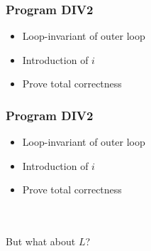 \begin{frame}[containsverbatim]
  \frametitle{Program DIV2}
  \begin{itemize}
    \item Loop-invariant of outer loop
    \item Introduction of $i$
    \item Prove total correctness
  \end{itemize}
\end{frame}

\begin{frame}[containsverbatim]
  \frametitle{Program DIV2}
  \begin{itemize}
    \item Loop-invariant of outer loop
    \item Introduction of $i$
    \item Prove total correctness
  \end{itemize}
  \\~\\
  But what about $L$?
\end{frame}
